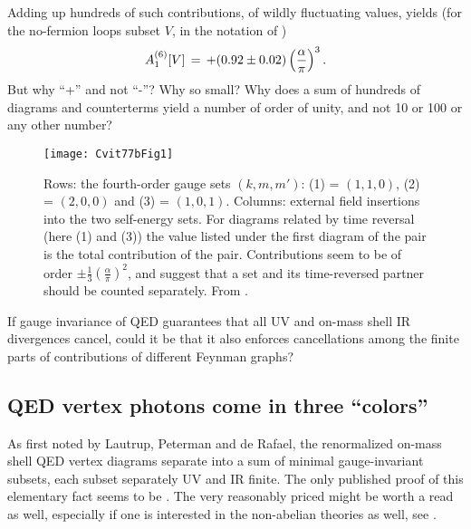 Adding up hundreds of such contributions, of wildly fluctuating values,
yields (for the no-fermion loops subset $V$, in the notation of
)
\[
 A_1^{(6)}[V]\,=\, +  (0.92 \pm 0.02) \left(\frac{\alpha}{\pi}\right)^3.
\]
But why ``+'' and not ``-''? Why so small? Why does a sum of hundreds of
diagrams and counterterms yield a number of order of unity, and not 10 or
100 or any other number?

\begin{figure}
\begin{center}
\texttt{[image: Cvit77bFig1]}
\end{center}
\caption{\label{Cvit77bFig1}
Rows: the fourth-order gauge sets
$(k,m,m')$: (1) = $(1,1,0)$,
(2) = $(2,0,0)$
and
(3) = $(1,0,1)$.
Columns: external field insertions into the two self-energy sets.
For diagrams related by time
reversal (here (1) and (3))
the value listed under the first diagram of the pair is
the total contribution of the pair. Contributions seem to be of order
$\pm\frac{1}{3}\left(\frac{\alpha}{\pi}\right)^2$, and suggest that
a set and its time-reversed partner should be counted separately.
From .
}
 \end{figure}

If gauge invariance of QED guarantees that all UV and on-mass shell IR
divergences cancel, could it be that it also enforces cancellations among
the finite parts of contributions of different Feynman graphs?

\subsection{QED vertex photons come in three ``colors''}
\label{sect:gaugeSetDeriv}

As first noted by Lautrup, Peterman and de Rafael, the
renormalized on-mass shell QED vertex diagrams separate into a sum of
minimal gauge-invariant subsets, each subset separately UV and IR finite.
The only published proof of this elementary fact seems to be
. The very reasonably priced  might be
worth a read as well, especially if one is interested in the non-abelian
theories as well,
see .

